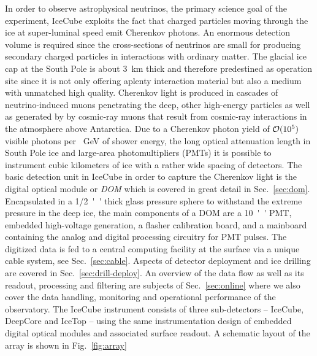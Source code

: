 In order to observe astrophysical neutrinos, the primary science goal of the experiment, IceCube exploits the fact that charged particles moving through
the ice at super-luminal speed emit Cherenkov photons. An enormous detection volume is required since the cross-sections of neutrinos are small for producing secondary charged particles in interactions with ordinary matter. The glacial ice cap at the South Pole is about \SI{3}{\kilo\meter} thick and therefore predestined as operation site since it is not only offering aplenty interaction material but also a medium with unmatched high quality. 
Cherenkov light is produced in cascades of neutrino-induced muons penetrating the deep, other high-energy particles as well as generated by by cosmic-ray muons that result from cosmic-ray interactions in the atmosphere above Antarctica. 
Due to a Cherenkov photon yield of $\mathcal{O}(\num{E5})$ visible photons per \SI{}{\giga\electronvolt} of shower energy, the long optical attenuation length in South Pole ice and large-area photomultipliers (PMTs) it is possible to instrument cubic kilometers of ice with a rather wide spacing of detectors.  
The basic detection unit in IceCube in order to capture the Cherenkov light is the digital optical module or \textit{DOM} which is covered in great detail in Sec.~\ref{sec:dom}. Encapsulated in a \SI{1/2}{''} thick glass pressure sphere to withstand the extreme pressure in the deep ice, the main components of a DOM are a \SI{10}{''} PMT, embedded high-voltage generation, a flasher calibration board, and a mainboard containing the analog and digital processing circuitry for PMT pulses. 
The digitized data is fed to a central computing facility at the surface via a unique cable system, see Sec.~\ref{sec:cable}. 
Aspects of detector deployment and ice drilling are covered in Sec.~\ref{sec:drill-deploy}.
An overview of the data flow as well as its readout, processing and filtering are subjects of Sec.~\ref{sec:online} where we also cover the data handling, monitoring and operational performance of the observatory.
The IceCube instrument consists of three sub-detectors -- IceCube, DeepCore and IceTop -- using the same instrumentation design of embedded digital optical modules and associated surface readout. A schematic layout of the array is shown in Fig.~\ref{fig:array} 

